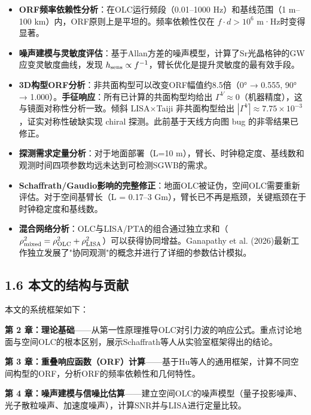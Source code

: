\documentclass[12pt,a4paper]{article}
\begin{document}
\begin{itemize}
  \item[1] \textbf{ORF频率依赖性分析}：在OLC运行频段（0.01–1000 Hz）和基线范围（1 m–100 km）内，ORF原则上是平坦的。频率依赖性仅在 $f \cdot d > 10^6$ m·Hz时变得显著。

  \item[2] \textbf{噪声建模与灵敏度评估}：基于Allan方差的噪声模型，计算了Sr光晶格钟的GW应变灵敏度曲线，发现 $h_{\rm sens} \propto f^{-1}$，臂长优化是提升灵敏度的最有效手段。

  \item[3] \textbf{3D构型ORF分析}：非共面构型可以改变ORF幅值约8.5倍（0° → 0.555, 90° → 1.000）。\textbf{手征响应}：所有已计算的共面构型均给出 $\Gamma^V \approx 0$（机器精度），这与镜面对称性分析一致。倾斜 LISA×Taiji 非共面构型给出 $|\Gamma^V| \approx 7.75\times 10^{-3}$，证实对称性破缺实现 chiral 探测。此前基于天线方向图 bug 的非零结果已修正。

  \item[4] \textbf{探测需求定量分析}：对于地面部署（L=10 m），臂长、时钟稳定度、基线数和观测时间四项参数均远未达到可检测SGWB的需求。

  \item[5] \textbf{Schaffrath/Gaudio影响的完整修正}：地面OLC被证伪，空间OLC需要重新评估。对于空间基臂长（L = 0.17–3 Gm），臂长已不再是瓶颈，关键瓶颈在于时钟稳定度和基线数。

  \item[6] \textbf{混合网络分析}：OLC与LISA/PTA的组合通过独立求和（$\rho_{\rm mixed}^2 = \rho_{\rm OLC}^2 + \rho_{\rm LISA}^2$）可以获得协同增益。Ganapathy et al. (2026)最新工作独立发展了"协同观测"的概念并进行了详细的参数估计模拟\cite{ref11}。

\end{itemize}
\subsection{1.6 本文的结构与贡献}


本文的系统框架如下：

\textbf{第 2 章：理论基础}——从第一性原理推导OLC对引力波的响应公式。重点讨论地面与空间OLC的根本区别，展示Schaffrath等人从实验室框架得出的结论。

\textbf{第 3 章：重叠响应函数（ORF）计算}——基于Hu等人的通用框架，计算不同空间构型的ORF，分析ORF的频率依赖性和几何特性。

\textbf{第 4 章：噪声建模与信噪比估算}——建立空间OLC的噪声模型（量子投影噪声、光子散粒噪声、加速度噪声），计算SNR并与LISA进行定量比较。
\end{document}

